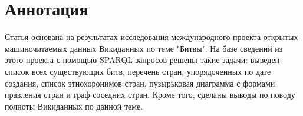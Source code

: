 \section{Аннотация}

Статья основана на результатах исследования международного проекта открытых машиночитаемых данных Викиданных по теме "Битвы". На базе сведений из этого проекта с помощью SPARQL-запросов решены такие задачи: выведен список всех существующих битв, перечень стран, упорядоченных по дате создания, список этнохоронимов стран, пузырьковая диаграмма с формами правления стран и граф соседних стран. Кроме того, сделаны выводы по поводу полноты Викиданных по данной теме.